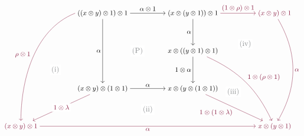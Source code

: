 \[
\begin{tikzcd}[
    sep= huge,
    cramped,
    cells={nodes={font=\small}},
    every label/.append style={font=\small}
]
    & ((x\otimes y)\otimes1)\otimes1
        \arrow[r,"\alpha\otimes1"]
        \arrow[dd,"\alpha"']
    & (x\otimes(y\otimes1))\otimes1
        \arrow[d,"\alpha"']
        \arrow[r,rojoDiagramaCIMAT,"(1\otimes\rho)\otimes1"]
    & |[text=rojoDiagramaCIMAT]| (x\otimes y)\otimes1
        \arrow[ddd,rojoDiagramaCIMAT,bend left=30,"\alpha"]
    \\
    && x\otimes((y\otimes1)\otimes1)
        \arrow[d,"1\otimes\alpha"']
        \arrow[ddr,rojoDiagramaCIMAT,bend left=20,"1\otimes(\rho\otimes1)"]
    &
    \\
    & (x\otimes y)\otimes(1\otimes1)
        \arrow[r,"\alpha"]
        \arrow[dl,rojoDiagramaCIMAT,"1\otimes\lambda" description]
    & x\otimes(y\otimes(1\otimes1))
        \arrow[dr,rojoDiagramaCIMAT,"1\otimes(1\otimes\lambda)"']
    &
    \\
    |[text=rojoDiagramaCIMAT]| (x\otimes y)\otimes1
        \arrow[rrr,rojoDiagramaCIMAT,"\alpha"']
    &&& |[text=rojoDiagramaCIMAT]| x\otimes(y\otimes1)
    \arrow[from=1-2,to=4-1,rojoDiagramaCIMAT,"\rho\otimes1"',
        to path={
            (\tikztostart.west)
            .. controls +(-20mm,-8mm) and +(0,18mm) ..
            (\tikztotarget.north)\tikztonodes
        }]
    \arrow[phantom,from=1-2,to=3-3,"\color{grisCIMAT}\mathrm{(P)}"{description,xshift=-5mm}]
    \arrow[phantom,from=1-2,to=4-1,"\color{grisCIMAT}\mathrm{(i)}"{description,xshift=-3mm}]
    \arrow[phantom,from=3-2,to=3-3,"\color{grisCIMAT}\mathrm{(ii)}"{description,yshift=-10mm}]
    \arrow[phantom,from=2-3,to=4-4,"\color{grisCIMAT}\mathrm{(iii)}"{description,pos=.55,xshift=-2mm}]
    \arrow[phantom,from=2-3,to=1-4,"\color{grisCIMAT}\mathrm{(iv)}"{description,pos=.45,xshift=7mm,yshift=-5mm}]
\end{tikzcd}
\]